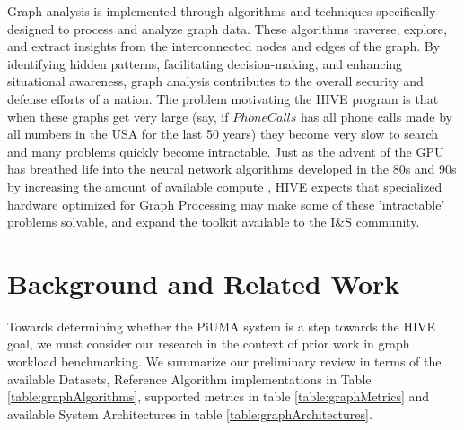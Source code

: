 \documentclass[letterpaper, 10pt]{article}
\begin{document}
\begin{multicols}{2}
        
        Graph analysis is implemented through algorithms and techniques specifically designed to process and analyze graph data. 
        These algorithms traverse, explore, and extract insights from the interconnected nodes and edges of the graph. By identifying hidden patterns, facilitating decision-making, and enhancing situational awareness, graph analysis contributes to the overall security and defense efforts of a nation. 
        The problem motivating the HIVE program is that when these graphs get very large (say, if $PhoneCalls$ has all phone calls made by all numbers in the USA for the last 50 years) they become very slow to search and many problems quickly become intractable.
        Just as the advent of the GPU has breathed life into the neural network algorithms developed in the 80s and 90s by increasing the amount of available compute \cite{Dally2021}, HIVE expects that specialized hardware optimized for Graph Processing may make some of these 'intractable' problems solvable, and expand the toolkit available to the I\&S community. 
        
    \section{Background and Related Work}\label{section:background}
        \par{Towards determining whether the PiUMA system is a step towards the HIVE goal, we must consider our research in the context of prior work in graph workload benchmarking. 
        We summarize our preliminary review in terms of the available Datasets, Reference Algorithm implementations in Table \ref{table:graphAlgorithms}, supported metrics in table \ref{table:graphMetrics} and available System Architectures in table \ref{table:graphArchitectures}.}


\end{multicols}
\end{document}
